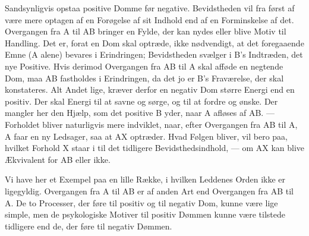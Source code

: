\documentclass[12pt,a4paper]{book}
\newcommand{\apage}[1]{\marginnote{\footnotesize\textit{[#1]}}}
\begin{document}
Sandsynligvis opstaa positive Domme før negative. Bevidstheden vil fra
først af være mere optagen af en Forøgelse af sit Indhold end af en
Forminskelse af det. Overgangen fra A til AB bringer en Fylde, der kan
nydes eller blive Motiv til Handling. Det er, forat en Dom skal
optræde, ikke nødvendigt, at det foregaaende Emne (A alene) bevares i
Erindringen; Bevidstheden svælger i B’s Indtræden, det nye Positive.
Hvis derimod Overgangen fra AB til A skal afføde en negtende Dom, maa AB
fastholdes i Erindringen, da det jo er B’s Fraværelse, der skal
konstateres. Alt Andet lige, kræver derfor en negativ Dom større Energi
end en positiv. Der skal Energi til at savne og sørge, og til at fordre
og ønske. Der mangler her den Hjælp, som det positive B yder, naar A
afløses af AB. --- Forholdet bliver naturligvis mere indviklet, naar,
efter Overgangen fra AB til A, A faar en ny Ledsager, saa at AX
optræder. Hvad Følgen bliver, vil bero paa, hvilket Forhold X staar i
til det tidligere Bevidsthedsindhold, --- om AX kan blive Ækvivalent for
AB eller ikke.

\apage{77} Vi have her et Exempel paa en lille Række, i hvilken Leddenes Orden ikke
er ligegyldig. Overgangen fra A til AB er af anden Art end Overgangen
fra AB til A. De to Processer, der føre til positiv og til negativ Dom,
kunne være lige simple, men de psykologiske Motiver til positiv Dømmen
kunne være tilstede tidligere end de, der føre til negativ Dømmen.
\end{document}
